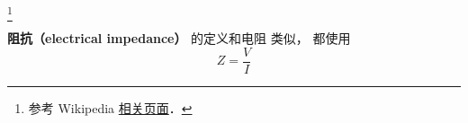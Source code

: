 
\begin{issues}
\issueDraft
\end{issues}


\footnote{参考 Wikipedia \href{https://en.wikipedia.org/wiki/Electrical_impedance}{相关页面}．}

\textbf{阻抗（electrical impedance）} 的定义和电阻 类似， 都使用
\begin{equation}
Z = \frac{V}{I}
\end{equation}

